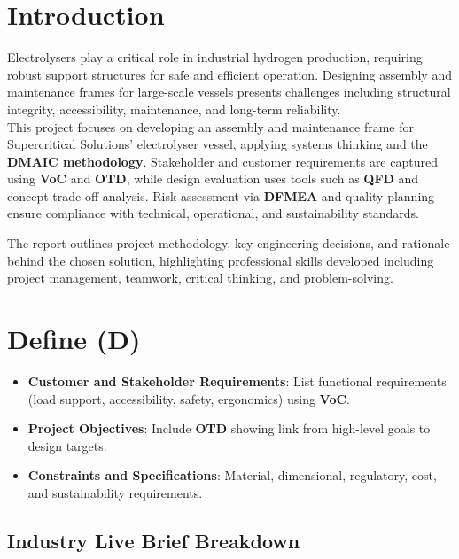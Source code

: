 \documentclass{report}
\begin{document}
\section{Introduction}
Electrolysers play a critical role in industrial hydrogen production, requiring {robust support structures} for safe and efficient operation. Designing assembly and maintenance frames for large-scale vessels presents challenges including structural integrity, accessibility, maintenance, and long-term reliability.\\[0.8em]
This project focuses on developing an assembly and maintenance frame for Supercritical Solutions’ electrolyser vessel, applying {systems thinking} and the \textbf{DMAIC methodology}. Stakeholder and customer requirements are captured using \textbf{VoC} and \textbf{OTD}, while design evaluation uses tools such as \textbf{QFD} and concept trade-off analysis. Risk assessment via \textbf{DFMEA} and quality planning ensure compliance with technical, operational, and sustainability standards. 

The report outlines project methodology, key engineering decisions, and rationale behind the chosen solution, highlighting professional skills developed including {project management}, {teamwork}, {critical thinking}, and {problem-solving}.

\newpage
\section{Define (D)}
\color{red!50!black}
\begin{itemize}[itemsep=-1mm]
	\item \textbf{Customer and Stakeholder Requirements}: List functional requirements (load support, accessibility, safety, ergonomics) using \textbf{VoC}.
	\item \textbf{Project Objectives}: Include \textbf{OTD} showing link from high-level goals to design targets.
	\item \textbf{Constraints and Specifications}: Material, dimensional, regulatory, cost, and sustainability requirements.
\end{itemize}
\color{black}

\subsection{Industry Live Brief Breakdown}
\end{document}
